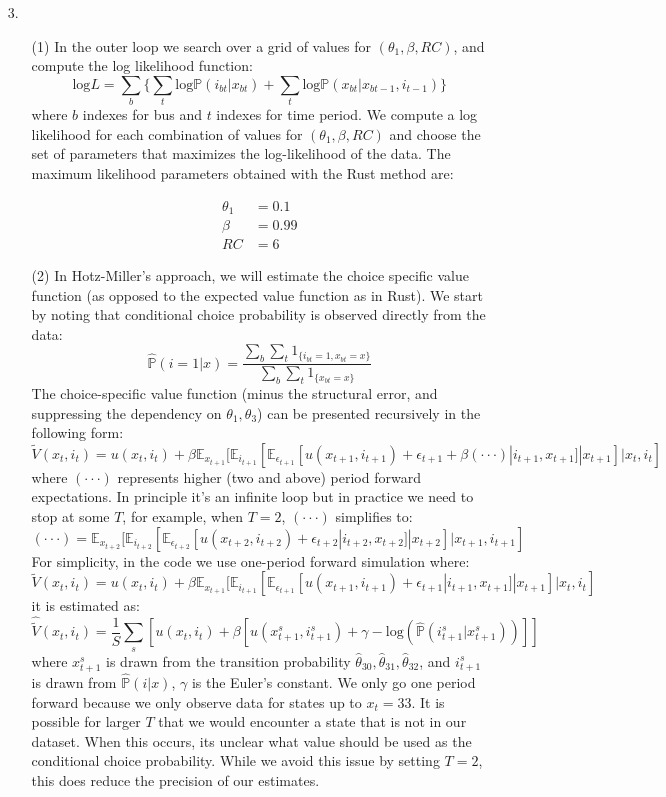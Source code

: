 \documentclass[paper=a4, fontsize=11pt]{scrartcl} %
\numberwithin{equation}{section} %
\numberwithin{figure}{section} %
\numberwithin{table}{section} %
\begin{document}
\begin{itemize}
\begin{itemize}
\end{itemize}

\item[3.]
\begin{itemize}
\item[(1)] In the outer loop we search over a grid of values for $(\theta_1, \beta, RC)$, and compute the log likelihood function:
\[\text{log}L = \sum_{b} \{\sum_{t} \text{log} \mathbb{P}(i_{bt}|x_{bt}) + \sum_t \text{log} \mathbb{P}(x_{bt}|x_{bt-1},i_{t-1})\}\]
where $b$ indexes for bus and $t$ indexes for time period. We compute a log likelihood for each combination of values for $(\theta_1, \beta, RC)$ and choose the set of parameters that maximizes the log-likelihood of the data. The maximum likelihood parameters obtained with the Rust method are:

\begin{eqnarray*}
\theta_1 & = 0.1 \\ 
\beta & = 0.99 \\ 
RC & = 6
\end{eqnarray*}

\item[(2)] In Hotz-Miller's approach, we will estimate the choice specific value function (as opposed to the expected value function as in Rust). We start by noting that conditional choice probability is observed directly from the data:
\[\hat{\mathbb{P}}(i=1|x) = \frac{\sum_{b}\sum_{t} 1_{\{i_{bt}=1, x_{bt}=x\}}}{\sum_{b}\sum_{t} 1_{\{x_{bt}=x\}}}\]
The choice-specific value function (minus the structural error, and suppressing the dependency on $\theta_1, \theta_3$) can be presented recursively in the following form:
\[\tilde{V}(x_t,i_t) = u(x_t,i_t)+\beta\mathbb{E}_{x_{t+1}}[\mathbb{E}_{i_{t+1}}[\mathbb{E}_{\epsilon_{t+1}}[u(x_{t+1},i_{t+1})+\epsilon_{t+1}+\beta(\cdot\cdot\cdot)|i_{t+1},x_{t+1}]|x_{t+1}]|x_t,i_t]\]
where $(\cdot\cdot\cdot)$ represents higher (two and above) period forward expectations. In principle it's an infinite loop but in practice we need to stop at some $T$, for example, when $T=2$, $(\cdot\cdot\cdot)$ simplifies to:
\[(\cdot\cdot\cdot) = \mathbb{E}_{x_{t+2}}[\mathbb{E}_{i_{t+2}}[\mathbb{E}_{\epsilon_{t+2}}[u(x_{t+2},i_{t+2})+\epsilon_{t+2}|i_{t+2},x_{t+2}]|x_{t+2}]|x_{t+1},i_{t+1}]\]
For simplicity, in the code we use one-period forward simulation where:
\[\tilde{V}(x_t,i_t) = u(x_t,i_t)+\beta\mathbb{E}_{x_{t+1}}[\mathbb{E}_{i_{t+1}}[\mathbb{E}_{\epsilon_{t+1}}[u(x_{t+1},i_{t+1})+\epsilon_{t+1}|i_{t+1},x_{t+1}]|x_{t+1}]|x_t,i_t]\]
it is estimated as:
\[\hat{\tilde{V}}(x_t,i_t) = \frac{1}{S} \sum_{s} [u(x_t,i_t)+\beta[u(x^s_{t+1},i^s_{t+1})+\gamma -\text{log}(\hat{\mathbb{P}}(i^s_{t+1}|x^s_{t+1}))]]\]
where $x^s_{t+1}$ is drawn from the transition probability $\hat{\theta}_{30}, \hat{\theta}_{31}, \hat{\theta}_{32}$, and $i^s_{t+1}$ is drawn from $\hat{\mathbb{P}}(i|x)$, $\gamma$ is the Euler's constant. We only go one period forward because we only observe data for states up to $x_t = 33$. It is possible for larger $T$ that we would encounter a state that is not in our dataset. When this occurs, its unclear what value should be used as the conditional choice probability. While we avoid this issue by setting $T = 2$, this does reduce the precision of our estimates.


\end{itemize}
\end{itemize}
\end{document}
